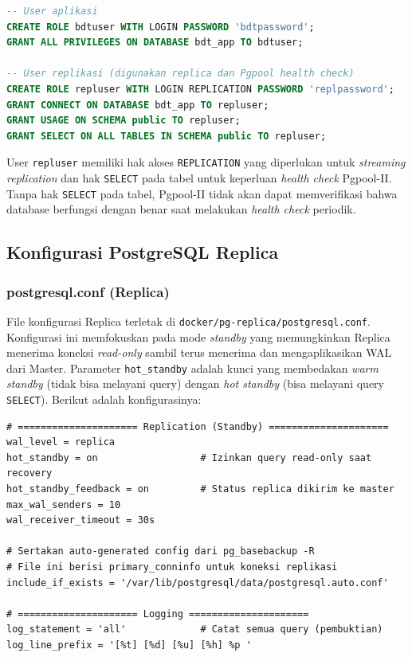 \begin{lstlisting}[language=SQL, caption={Inisialisasi User Replikasi
dan Aplikasi (docker/pg-master/init.sql)}, label={lst:init-sql}]
-- User aplikasi
CREATE ROLE bdtuser WITH LOGIN PASSWORD 'bdtpassword';
GRANT ALL PRIVILEGES ON DATABASE bdt_app TO bdtuser;

-- User replikasi (digunakan replica dan Pgpool health check)
CREATE ROLE repluser WITH LOGIN REPLICATION PASSWORD 'replpassword';
GRANT CONNECT ON DATABASE bdt_app TO repluser;
GRANT USAGE ON SCHEMA public TO repluser;
GRANT SELECT ON ALL TABLES IN SCHEMA public TO repluser;
\end{lstlisting}

User \texttt{repluser} memiliki hak akses \texttt{REPLICATION} yang
diperlukan untuk \textit{streaming replication} dan hak
\texttt{SELECT} pada tabel untuk keperluan \textit{health check}
Pgpool-II. Tanpa hak \texttt{SELECT} pada tabel, Pgpool-II tidak akan
dapat memverifikasi bahwa database berfungsi dengan benar saat
melakukan \textit{health check} periodik.

\subsection{Konfigurasi PostgreSQL Replica}

\subsubsection{postgresql.conf (Replica)}

File konfigurasi Replica terletak di
\texttt{docker/pg-replica/postgresql.conf}. Konfigurasi ini
memfokuskan pada mode \textit{standby} yang memungkinkan Replica
menerima koneksi \textit{read-only} sambil terus menerima dan
mengaplikasikan WAL dari Master. Parameter \texttt{hot\_standby}
adalah kunci yang membedakan \textit{warm standby} (tidak bisa
melayani query) dengan \textit{hot standby} (bisa melayani query
\texttt{SELECT}). Berikut adalah konfigurasinya:

\begin{lstlisting}[caption={Konfigurasi PostgreSQL Replica
(docker/pg-replica/postgresql.conf)}, label={lst:replica-conf}]
# ===================== Replication (Standby) =====================
wal_level = replica
hot_standby = on                  # Izinkan query read-only saat recovery
hot_standby_feedback = on         # Status replica dikirim ke master
max_wal_senders = 10
wal_receiver_timeout = 30s

# Sertakan auto-generated config dari pg_basebackup -R
# File ini berisi primary_conninfo untuk koneksi replikasi
include_if_exists = '/var/lib/postgresql/data/postgresql.auto.conf'

# ===================== Logging =====================
log_statement = 'all'             # Catat semua query (pembuktian)
log_line_prefix = '[%t] [%d] [%u] [%h] %p '
\end{lstlisting}


